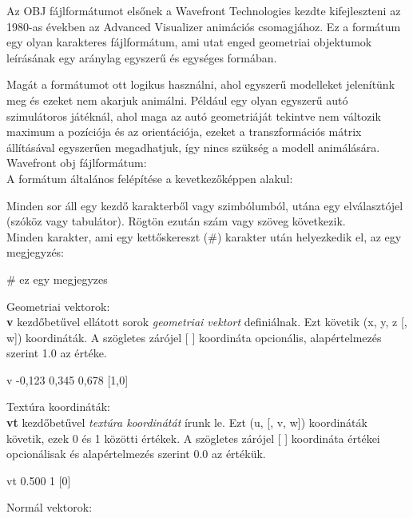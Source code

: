
Az OBJ fájlformátumot elsőnek a Wavefront Technologies kezdte kifejleszteni az 1980-as években az Advanced Visualizer animációs csomagjához. Ez a formátum egy olyan karakteres fájlformátum, ami utat enged geometriai objektumok leírásának egy aránylag egyszerű és egységes formában.\cite{martinreddy}

Magát a formátumot ott logikus használni, ahol egyszerű modelleket jelenítünk meg és ezeket nem akarjuk animálni. Például egy olyan egyszerű autó szimulátoros játéknál, ahol maga az autó geometriáját tekintve nem változik maximum a pozíciója és az orientációja, ezeket a transzformációs mátrix állításával egyszerűen megadhatjuk, így nincs szükség a modell animálására.\\

\noindent Wavefront obj fájlformátum:\\

\noindent A formátum általános felépítése a kevetkezőképpen alakul:

Minden sor áll egy kezdő karakterből vagy szimbólumból, utána egy elválasztójel (szóköz vagy tabulátor). Rögtön ezután szám vagy szöveg következik.\\

\noindent Minden karakter, ami egy kettőskereszt (\#) karakter után helyezkedik el, az egy megjegyzés:

\bigskip
\begin{python}
# ez egy megjegyzes
\end{python}
\bigskip
Geometriai vektorok:\\

\noindent \textbf{v} kezdőbetűvel ellátott sorok \textsl{geometriai vektort} definiálnak. Ezt követik (x, y, z [, w]) koordináták. A szögletes zárójel [ ] koordináta opcionális, alapértelmezés szerint 1.0 az értéke.
\bigskip
\begin{python} 
v -0,123 0,345 0,678 [1,0]
\end{python}
\newpage
\noindent Textúra koordináták:\\

\noindent \textbf{vt} kezdőbetűvel \textsl{textúra koordinátát} írunk le. Ezt (u, [, v, w]) koordináták követik, ezek 0 és 1 közötti értékek. A szögletes zárójel [ ] koordináta értékei opcionálisak és alapértelmezés szerint 0.0 az értékük.

\bigskip
\begin{python} 
vt 0.500 1 [0]
\end{python}
\bigskip
Normál vektorok:\\

